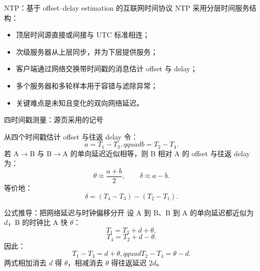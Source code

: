 \documentclass[UTF8,fontset=none,aspectratio=169,10pt]{beamer}
\begin{document}
\begin{frame}{NTP：基于 offset--delay estimation 的互联网时间协议}
NTP 采用分层时间服务结构：
\begin{itemize}
  \item 顶层时间源直接或间接与 UTC 标准相连；
  \item 次级服务器从上层同步，并为下层提供服务；
  \item 客户端通过网络交换带时间戳的消息估计 offset 与 delay；
  \item 多个服务器和多轮样本用于容错与滤除异常；
  \item 关键难点是未知且变化的双向网络延迟。
\end{itemize}
\end{frame}

\begin{frame}{四时间戳测量：源页采用的记号}
\begin{center}
\end{center}
\end{frame}

\begin{frame}{从四个时间戳估计 offset 与往返 delay}
令：
\[
a=T_1-T_3,qquad b=T_2-T_4.
\]
若 A$\rightarrow$B 与 B$\rightarrow$A 的单向延迟近似相等，则 B 相对 A 的 offset 与往返 delay 为：
\[
\theta\approx\frac{a+b}{2},
\qquad
\delta\approx a-b.
\]
等价地：
\[
\delta=(T_4-T_3)-(T_2-T_1).
\]
\end{frame}

\begin{frame}{公式推导：把网络延迟与时钟偏移分开}
设 A 到 B、B 到 A 的单向延迟都近似为 $d$，B 的时钟比 A 快 $\theta$：
\[
T_1=T_3+d+\theta,
\]
\[
T_4=T_2+d-\theta.
\]
因此：
\[
T_1-T_3=d+\theta,qquad T_2-T_4=\theta-d.
\]
两式相加消去 $d$ 得 $\theta$，相减消去 $\theta$ 得往返延迟 $2d$。
\end{frame}
\end{document}
